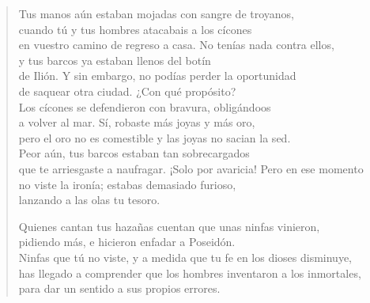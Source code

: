 \documentclass[11pt,a4paper]{article}
\begin{document}
\begin{verse}
Tus manos aún estaban mojadas con sangre de troyanos,\\
cuando tú y tus hombres atacabais a los cícones\\
en vuestro camino de regreso a casa. No tenías nada contra ellos,\\
y tus barcos ya estaban llenos del botín\\
de Ilión. Y sin embargo, no podías perder la oportunidad\\
de saquear otra ciudad. ¿Con qué propósito?\\
Los cícones se defendieron con bravura, obligándoos\\
a volver al mar. Sí, robaste más joyas y más oro,\\
pero el oro no es comestible y las joyas no sacian la sed.\\
Peor aún, tus barcos estaban tan sobrecargados\\
que te arriesgaste a naufragar. ¡Solo por avaricia! Pero en ese momento\\
no viste la ironía; estabas demasiado furioso,\\
lanzando a las olas tu tesoro.

Quienes cantan tus hazañas cuentan que unas ninfas vinieron,\\
pidiendo más, e hicieron enfadar a Poseidón.\\
Ninfas que tú no viste, y a medida que tu fe en los dioses disminuye,\\
has llegado a comprender que los hombres inventaron a los inmortales,\\
para dar un sentido a sus propios errores.
\end{verse}
\end{document}
